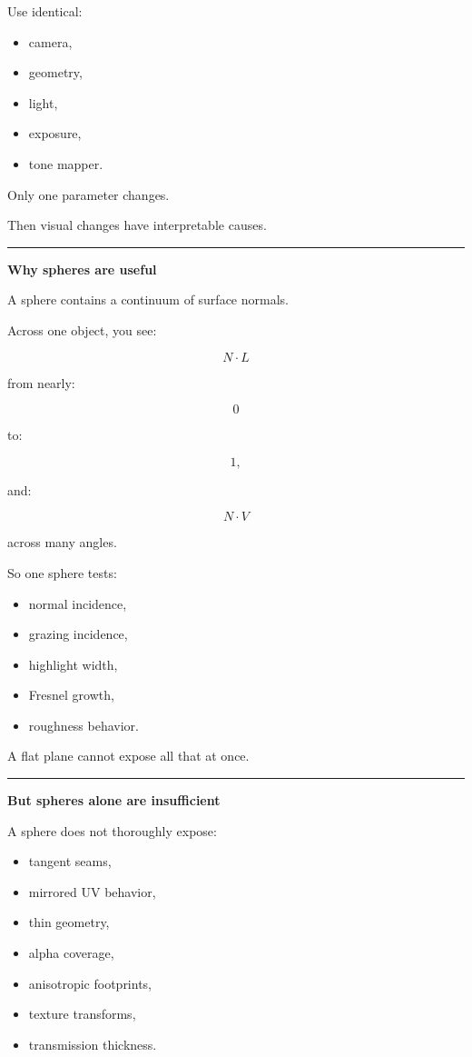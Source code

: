 Use identical:

\begin{itemize}
\tightlist
\item
  camera,
\item
  geometry,
\item
  light,
\item
  exposure,
\item
  tone mapper.
\end{itemize}

Only one parameter changes.

Then visual changes have interpretable causes.

\begin{center}\rule{0.5\linewidth}{0.5pt}\end{center}

\textbf{Why spheres are useful}

A sphere contains a continuum of surface normals.

Across one object, you see:

\[
N\cdot L
\]

from nearly:

\[
0
\]

to:

\[
1,
\]

and:

\[
N\cdot V
\]

across many angles.

So one sphere tests:

\begin{itemize}
\tightlist
\item
  normal incidence,
\item
  grazing incidence,
\item
  highlight width,
\item
  Fresnel growth,
\item
  roughness behavior.
\end{itemize}

A flat plane cannot expose all that at once.

\begin{center}\rule{0.5\linewidth}{0.5pt}\end{center}

\textbf{But spheres alone are insufficient}

A sphere does not thoroughly expose:

\begin{itemize}
\tightlist
\item
  tangent seams,
\item
  mirrored UV behavior,
\item
  thin geometry,
\item
  alpha coverage,
\item
  anisotropic footprints,
\item
  texture transforms,
\item
  transmission thickness.
\end{itemize}

